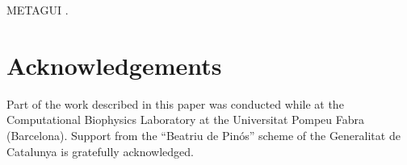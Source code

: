 \documentclass[preprint,12pt]{elsarticle}
\begin{document}
METAGUI \cite{Biarnes_Pietrucci_Marinelli_Laio_2012}.





\section{Acknowledgements}

Part of the work described in this paper was conducted while at the
Computational Biophysics Laboratory at the Universitat Pompeu Fabra
(Barcelona). Support from the ``Beatriu de Pin\'os'' scheme of the
Generalitat de Catalunya is gratefully acknowledged.







\end{document}
